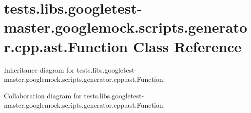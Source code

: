 \hypertarget{classtests_1_1libs_1_1googletest-master_1_1googlemock_1_1scripts_1_1generator_1_1cpp_1_1ast_1_1Function}{}\section{tests.\+libs.\+googletest-\/master.googlemock.\+scripts.\+generator.\+cpp.\+ast.\+Function Class Reference}
\label{classtests_1_1libs_1_1googletest-master_1_1googlemock_1_1scripts_1_1generator_1_1cpp_1_1ast_1_1Function}


Inheritance diagram for tests.\+libs.\+googletest-\/master.googlemock.\+scripts.\+generator.\+cpp.\+ast.\+Function\+:


Collaboration diagram for tests.\+libs.\+googletest-\/master.googlemock.\+scripts.\+generator.\+cpp.\+ast.\+Function\+:
